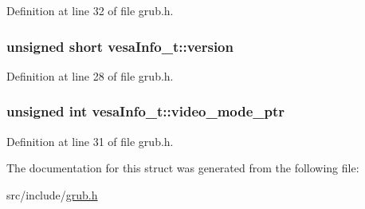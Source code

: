 Definition at line 32 of file grub.\+h.

\hypertarget{structvesaInfo__t_a6c1001f337933e02a68640cfc7abdfb6}{
\subsubsection[{version}]{\setlength{\rightskip}{0pt plus 5cm}unsigned short vesa\+Info\+\_\+t\+::version}}\label{structvesaInfo__t_a6c1001f337933e02a68640cfc7abdfb6}


Definition at line 28 of file grub.\+h.

\hypertarget{structvesaInfo__t_af4342c2c5c65c802e4a042d324572b9d}{
\subsubsection[{video\+\_\+mode\+\_\+ptr}]{\setlength{\rightskip}{0pt plus 5cm}unsigned int vesa\+Info\+\_\+t\+::video\+\_\+mode\+\_\+ptr}}\label{structvesaInfo__t_af4342c2c5c65c802e4a042d324572b9d}


Definition at line 31 of file grub.\+h.



The documentation for this struct was generated from the following file\+:\begin{DoxyCompactItemize}
\item 
src/include/\hyperlink{grub_8h}{grub.\+h}\end{DoxyCompactItemize}
